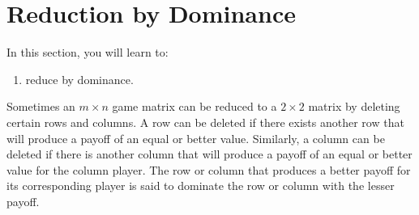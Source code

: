 \section{Reduction by Dominance}

In this section, you will learn to:
\begin{enumerate}
    \item reduce by dominance.
\end{enumerate}

Sometimes an $m\times n$ game matrix can be reduced to a $2\times 2$ matrix by deleting certain rows and columns.  A row can be deleted if there exists another row that will produce a payoff of an equal or better value.  Similarly, a column can be deleted if there is another column that will produce a payoff of an equal or better value for the column player.  The row or column that produces a better payoff for its corresponding player is said to dominate the row or column with the lesser payoff.

